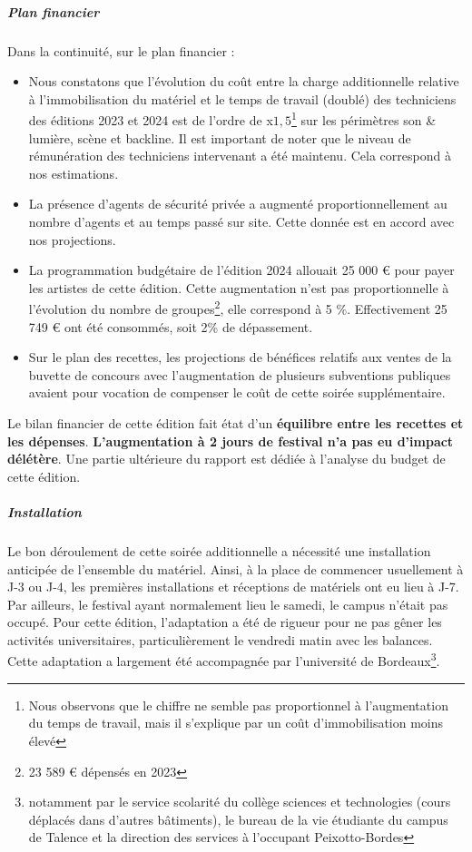 \documentclass[12pt,a4paper]{report}
\begin{document}
\subparagraph{Plan financier}
Dans la continuité, sur le plan financier :
\begin{itemize}
\item Nous constatons que l'évolution du coût entre la charge additionnelle relative à l'immobilisation du matériel et le temps de travail (doublé) des techniciens des éditions 2023 et 2024 est de l'ordre de x$1,5$\footnote{Nous observons que le chiffre ne semble pas proportionnel à l'augmentation du temps de travail, mais il s'explique par un coût d'immobilisation moins élevé} sur les périmètres son \& lumière, scène et backline. Il est important de noter que le niveau de rémunération des techniciens intervenant a été maintenu. Cela correspond à nos estimations.
\item La présence d'agents de sécurité privée a augmenté proportionnellement au nombre d'agents et au temps passé sur site. Cette donnée est en accord avec nos projections.
\item La programmation budgétaire de l'édition 2024 allouait 25 000 € pour payer les artistes de cette édition. Cette augmentation n'est pas proportionnelle à l'évolution du nombre de groupes\footnote{23 589 € dépensés en 2023}, elle correspond à 5 \%. Effectivement 25 749 € ont été consommés, soit 2\% de dépassement.
\item Sur le plan des recettes, les projections de bénéfices relatifs aux ventes de la buvette de concours avec l'augmentation de plusieurs subventions publiques avaient pour vocation de compenser le coût de cette soirée supplémentaire.\\
\end{itemize}
Le bilan financier de cette édition fait état d'un \textbf{équilibre entre les recettes et les dépenses}. \textbf{L'augmentation à 2 jours de festival n'a pas eu d'impact délétère}. Une partie ultérieure du rapport est dédiée à l'analyse du budget de cette édition.

\subparagraph{Installation}
Le bon déroulement de cette soirée additionnelle a nécessité une installation anticipée de l'ensemble du matériel. Ainsi, à la place de commencer usuellement à J-3 ou J-4, les premières installations et réceptions de matériels ont eu lieu à J-7. Par ailleurs, le festival ayant normalement lieu le samedi, le campus n'était pas occupé. Pour cette édition, l’adaptation a été de rigueur pour ne pas gêner les activités universitaires, particulièrement le vendredi matin avec les balances. Cette adaptation a largement été accompagnée par l'université de Bordeaux\footnote{notamment par le service scolarité du collège sciences et technologies (cours déplacés dans d'autres bâtiments), le bureau de la vie étudiante du campus de Talence et la direction des services à l'occupant Peixotto-Bordes}.
\end{document}
